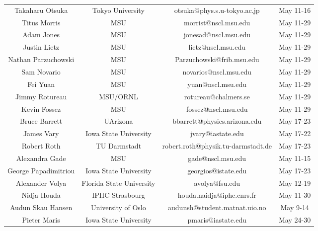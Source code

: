 \documentclass{beamer}
\begin{document}
\begin{frame}
\begin{block}{}
{\begin{tabular}{cccc}
Takaharu Otsuka      & Tokyo University                       & otsuka@phys.s.u-tokyo.ac.jp        & May 11-16            \\
Titus Morris         & MSU                                    & morrist@nscl.msu.edu               & May 11-29            \\
Adam Jones           & MSU                                    & jonesad@nscl.msu.edu               & May 11-29            \\
Justin Lietz         & MSU                                    & lietz@nscl.msu.edu                 & May 11-29            \\
Nathan Parzuchowski  & MSU                                    & Parzuchowski@frib.msu.edu          & May 11-29            \\
Sam Novario          & MSU                                    & novarios@nscl.msu.edu              & May 11-29            \\
Fei Yuan             & MSU                                    & yuan@nscl.msu.edu                  & May 11-29            \\
Jimmy Rotureau       & MSU/ORNL                               & rotureau@chalmers.se               & May 11-29            \\
Kevin Fossez         & MSU                                    & fossez@nscl.msu.edu                & May 11-29            \\
Bruce Barrett        & UArizona                               & bbarrett@physics.arizona.edu       & May 17-23            \\
James Vary           & Iowa State University                  & jvary@iastate.edu                  & May 17-22            \\
Robert Roth          & TU Darmstadt                           & robert.roth@physik.tu-darmstadt.de & May 17-23            \\
Alexandra Gade       & MSU                                    & gade@nscl.msu.edu                  & May 11-15            \\
George Papadimitriou & Iowa State University                  & georgios@istate.edu                & May 17-23            \\
Alexander Volya      & Florida State University               & avolya@fsu.edu                     & May 12-19            \\
Nidja Houda          & IPHC Strasbourg                        & houda.naidja@iphc.cnrs.fr          & May 11-30            \\
Audun Skau Hansen    & University of Oslo                     & audunsh@student.matnat.uio.no      & May 9-14             \\
Pieter Maris         & Iowa State University                  & pmaris@iastate.edu                 & May 24-30            \\
\hline
\end{tabular}
}

\noindent
\end{block}
\end{frame}
\end{document}
